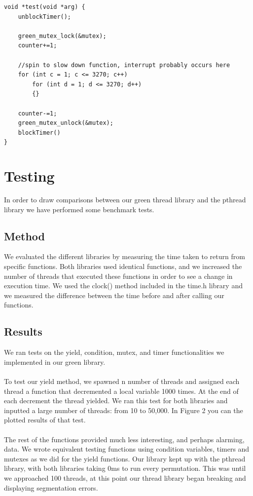 \documentclass[11pt]{article}
\begin{document}
\begin{verbatim}
void *test(void *arg) {
    unblockTimer();
    
    green_mutex_lock(&mutex);
    counter+=1;

    //spin to slow down function, interrupt probably occurs here
    for (int c = 1; c <= 3270; c++)
        for (int d = 1; d <= 3270; d++)
        {}

    counter-=1;
    green_mutex_unlock(&mutex);
    blockTimer()
}
\end{verbatim}

\section{Testing}\label{Testing}

In order to draw comparisons between our green thread library and the pthread library we have performed some benchmark tests. 

\subsection{Method}

We evaluated the different libraries by measuring the time taken to return from specific functions. Both libraries used identical functions, and we increased the number of threads that executed these functions in order to see a change in execution time. We used the clock() method included in the time.h library and we measured the difference between the time before and after calling our functions.

\subsection{Results}

We ran tests on the yield, condition, mutex, and timer functionalities we implemented in our green library.
\\
\\
To test our yield method, we spawned n number of threads and assigned each thread a function that decremented a local variable 1000 times. At the end of each decrement the thread yielded. We ran this test for both libraries and inputted a large number of threads: from 10 to 50,000. In Figure 2 you can the plotted results of that test. 
\\
\\
The rest of the functions provided much less interesting, and perhaps alarming, data. We wrote equivalent testing functions using condition variables, timers and mutexes as we did for the yield functions. Our library kept up with the pthread library, with both libraries taking 0ms to run every permutation. This was until we approached 100 threads, at this point our thread library began breaking and displaying segmentation errors. 
\end{document}

